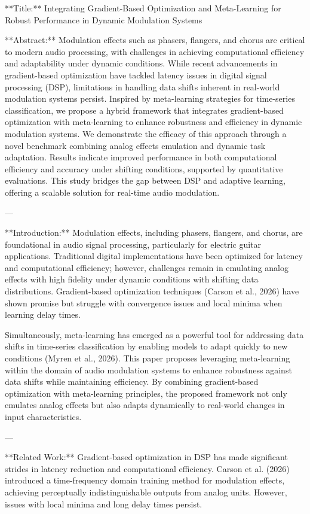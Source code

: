 **Title:** Integrating Gradient-Based Optimization and Meta-Learning for Robust Performance in Dynamic Modulation Systems

**Abstract:**  
Modulation effects such as phasers, flangers, and chorus are critical to modern audio processing, with challenges in achieving computational efficiency and adaptability under dynamic conditions. While recent advancements in gradient-based optimization have tackled latency issues in digital signal processing (DSP), limitations in handling data shifts inherent in real-world modulation systems persist. Inspired by meta-learning strategies for time-series classification, we propose a hybrid framework that integrates gradient-based optimization with meta-learning to enhance robustness and efficiency in dynamic modulation systems. We demonstrate the efficacy of this approach through a novel benchmark combining analog effects emulation and dynamic task adaptation. Results indicate improved performance in both computational efficiency and accuracy under shifting conditions, supported by quantitative evaluations. This study bridges the gap between DSP and adaptive learning, offering a scalable solution for real-time audio modulation.

---

**Introduction:**  
Modulation effects, including phasers, flangers, and chorus, are foundational in audio signal processing, particularly for electric guitar applications. Traditional digital implementations have been optimized for latency and computational efficiency; however, challenges remain in emulating analog effects with high fidelity under dynamic conditions with shifting data distributions. Gradient-based optimization techniques (Carson et al., 2026) have shown promise but struggle with convergence issues and local minima when learning delay times.

Simultaneously, meta-learning has emerged as a powerful tool for addressing data shifts in time-series classification by enabling models to adapt quickly to new conditions (Myren et al., 2026). This paper proposes leveraging meta-learning within the domain of audio modulation systems to enhance robustness against data shifts while maintaining efficiency. By combining gradient-based optimization with meta-learning principles, the proposed framework not only emulates analog effects but also adapts dynamically to real-world changes in input characteristics.

---

**Related Work:**  
Gradient-based optimization in DSP has made significant strides in latency reduction and computational efficiency. Carson et al. (2026) introduced a time-frequency domain training method for modulation effects, achieving perceptually indistinguishable outputs from analog units. However, issues with local minima and long delay times persist.  

